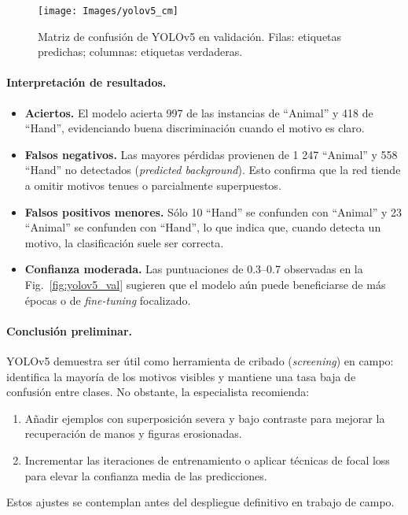 \begin{figure}[!ht]
  \centering
  \texttt{[image: Images/yolov5\_cm]}
  \caption{Matriz de confusión de YOLOv5 en validación.
           Filas: etiquetas predichas; columnas: etiquetas verdaderas.}
  \label{fig:yolov5_cm}
\end{figure}

\paragraph{Interpretación de resultados.}

\begin{itemize}
  \item \textbf{Aciertos.}
        El modelo acierta 997 de las instancias de “Animal” y 418 de “Hand”, evidenciando buena discriminación cuando el motivo es claro.
  \item \textbf{Falsos negativos.}
        Las mayores pérdidas provienen de 1 247 “Animal” y 558 “Hand” no detectados (\emph{predicted background}).
        Esto confirma que la red tiende a omitir motivos tenues o parcialmente superpuestos.
  \item \textbf{Falsos positivos menores.}
        Sólo 10 “Hand” se confunden con “Animal” y 23 “Animal” se confunden con “Hand”, lo que indica que, cuando detecta un motivo, la clasificación suele ser correcta.
  \item \textbf{Confianza moderada.}
        Las puntuaciones de 0.3–0.7 observadas en la Fig.~\ref{fig:yolov5_val} sugieren que el modelo aún puede beneficiarse de más épocas o de \emph{fine-tuning} focalizado.
\end{itemize}

\paragraph{Conclusión preliminar.}
YOLOv5 demuestra ser útil como herramienta de cribado (\emph{screening}) en campo: identifica la mayoría de los motivos visibles y mantiene una tasa baja de confusión entre clases.
No obstante, la especialista recomienda:

\begin{enumerate}
  \item Añadir ejemplos con superposición severa y bajo contraste para mejorar la recuperación de manos y figuras erosionadas.
  \item Incrementar las iteraciones de entrenamiento o aplicar técnicas de focal loss para elevar la confianza media de las predicciones.
\end{enumerate}
Estos ajustes se contemplan antes del despliegue definitivo en trabajo de campo.

